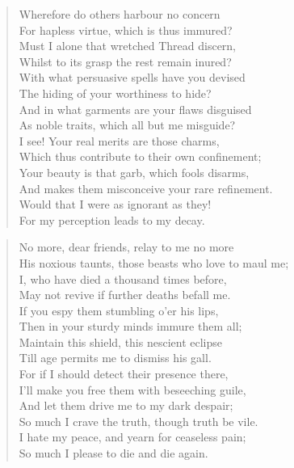 \documentclass[b6paper, oneside]{memoir}
\begin{document}
\PoemTitle{}
\begin{verse}
    Wherefore do others harbour no concern \\
    For hapless virtue, which is thus immured? \\
    Must I alone that wretched Thread discern, \\
    Whilst to its grasp the rest remain inured? \\
    With what persuasive spells have you devised \\
    The hiding of your worthiness to hide? \\
    And in what garments are your flaws disguised \\
    As noble traits, which all but me misguide? \\
    I see! Your real merits are those charms, \\
    Which thus contribute to their own confinement; \\
    Your beauty is that garb, which fools disarms, \\
    And makes them misconceive your rare refinement. \\
    \vin Would that I were as ignorant as they! \\
    \vin For my perception leads to my decay.
\end{verse}

\PoemTitle{}
\begin{verse}
    No more, dear friends, relay to me no more \\
    His noxious taunts, those beasts who love to maul me; \\
    I, who have died a thousand times before, \\
    May not revive if further deaths befall me. \\ 
    If you espy them stumbling o'er his lips, \\
    Then in your sturdy minds immure them all; \\
    Maintain this shield, this nescient eclipse \\
    Till age permits me to dismiss his gall. \\
    For if I should detect their presence there, \\
    I'll make you free them with beseeching guile, \\
    And let them drive me to my dark despair; \\
    So much I crave the truth, though truth be vile. \\
    \vin I hate my peace, and yearn for ceaseless pain; \\
    \vin So much I please to die and die again.
\end{verse}
\end{document}
